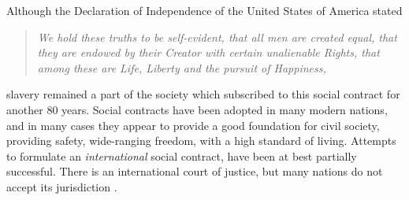Although the Declaration of Independence of the United States of America stated
\begin{quote}\em
We hold these truths to be self-evident, that all men are created equal,
that they are endowed by their Creator with certain unalienable Rights,
that among these are Life, Liberty and the pursuit of Happiness,
\end{quote}
slavery remained a part of the society which subscribed to this social contract
for another 80 years. 
%
Social contracts have been adopted in many modern nations, and in many cases they
appear to provide a good foundation for civil society, providing safety, wide-ranging 
freedom, with a high standard of living. Attempts to formulate an {\em international}
social contract, have been at best partially successful. There is an international court
of justice, but many nations do not accept its jurisdiction \cite{Robertson}.




